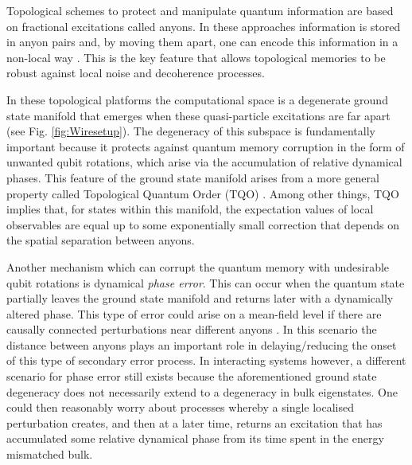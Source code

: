 \documentclass[aps,pra,floatfix,footinbib,longbibliography,twocolumn,superscriptaddress, preprintnumbers, nobibnotes]{revtex4-1}
\begin{document}
Topological schemes to protect and manipulate quantum information are based on fractional excitations called anyons. In these approaches information is stored in anyon pairs and, by moving them apart, one can encode this information in a non-local way \cite{Kitaev2001,Dennis2002,Kitaev2003,Kitaev2006,NayakRev,Stanescu2013}. This is the key feature that allows topological memories to be robust against local noise and decoherence processes. 

In these topological platforms the computational space is a degenerate ground state manifold that emerges when these quasi-particle excitations are far apart (see Fig. \ref{fig:Wiresetup}). The degeneracy of this subspace is fundamentally important because it protects against quantum memory corruption in the form of unwanted qubit rotations, which arise via the accumulation of relative dynamical phases. This feature of the ground state manifold arises from a more general property called Topological Quantum Order (TQO) \cite{PhysRevB.41.9377, Wen:1989iv, Hastings2005, Bravyi2010h, zeng2019quantum}. Among other things, TQO implies that, for states within this manifold, the expectation values of local observables are equal up to some exponentially small correction that depends on the spatial separation between anyons.

Another mechanism which can corrupt the quantum memory with undesirable qubit rotations is dynamical \emph{phase error}. This can occur when the quantum state partially leaves the ground state manifold and returns later with a dynamically altered phase. This type of error could arise on a mean-field level if there are causally connected perturbations near different anyons \cite{Conlon2019}. In this scenario the distance between anyons plays an important role in delaying/reducing the onset of this type of secondary error process. In interacting systems however, a different scenario for phase error still exists because the aforementioned ground state degeneracy does not necessarily extend to a degeneracy in bulk eigenstates. One could then reasonably worry about processes whereby a single localised perturbation creates, and then at a later time, returns an excitation that has accumulated some relative dynamical phase from its time spent in the energy mismatched bulk.
\end{document}
